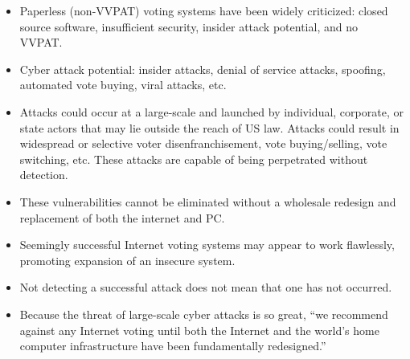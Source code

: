\begin{itemize}
  \item Paperless (non-VVPAT) voting systems have been widely criticized: closed
    source software, insufficient security, insider attack potential, and no
    VVPAT.\

  \item Cyber attack potential: insider attacks, denial of service attacks,
    spoofing, automated vote buying, viral attacks, etc.

  \item Attacks could occur at a large-scale and launched by individual,
    corporate, or state actors that may lie outside the reach of US law. Attacks
    could result in widespread or selective voter disenfranchisement, vote
    buying/selling, vote switching, etc. These attacks are capable of being
    perpetrated without detection.

  \item These vulnerabilities cannot be eliminated without a wholesale redesign
    and replacement of both the internet and PC.\

  \item Seemingly successful Internet voting systems may appear to work
    flawlessly, promoting expansion of an insecure system.

  \item Not detecting a successful attack does not mean that one has not
    occurred.

  \item Because the threat of large-scale cyber attacks is so great, ``we
    recommend against any Internet voting until both the Internet and the
    world's home computer infrastructure have been fundamentally redesigned.''
\end{itemize}

%


